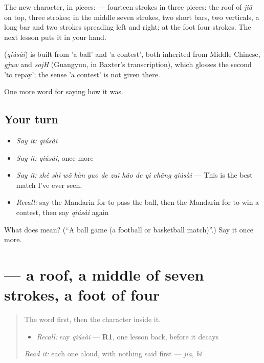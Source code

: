 The new character, in pieces:  — fourteen strokes in three pieces: the roof of  \emph{jiā} on top, three strokes; in the middle seven strokes, two short bars, two verticals, a long bar and two strokes spreading left and right; at the foot four strokes. The next lesson puts it in your hand.

\begin{cousinweb}
\textbf{} (\emph{qiúsài}) is built from  'a ball' and  'a contest', both inherited from Middle Chinese, \emph{gjuw} and \emph{sojH} (Guangyun, in Baxter's transcription), which glosses the second 'to repay'; the sense 'a contest' is not given there.
\end{cousinweb}

\begin{grammarlens}[title={What you've built}]
One more word for saying how it was.
\end{grammarlens}

\subsection*{Your turn}
\begin{itemize}
\raggedright
  \item \emph{Say it:} \emph{qiúsài}
  \item \emph{Say it:} \emph{qiúsài}, once more
  \item \emph{Say it:} \emph{zhè shì wǒ kàn guo de zuì hǎo de yì chǎng qiúsài} — This is the best match I've ever seen.
  \item \emph{Recall:} say the Mandarin for to pass the ball, then the Mandarin for to win a contest, then say \emph{qiúsài} again
\end{itemize}

\begin{tcolorbox}[breakable,colback=teal!4,colframe=teal!35!black,title={Before you move on}]
What does  mean? (\textquotedblleft{}A ball game (a football or basketball match)\textquotedblright{}.) Say it once more.
\end{tcolorbox}
\section[\texorpdfstring{\zh{赛} (sài)}{赛 (sài)}]{ — a roof, a middle of seven strokes, a foot of four}

\label{lesson:ZH-W500-sai-match}



\begin{quote}
The word first, then the character inside it.

\begin{itemize}
\raggedright
  \item \emph{Recall:} say \emph{qiúsài} — \textbf{R1}, one lesson back, before it decays
\end{itemize}

\begin{quote}
 
\end{quote}

\emph{Read it:} each one aloud, with nothing said first — \emph{jiā}, \emph{bǐ}
\end{quote}

